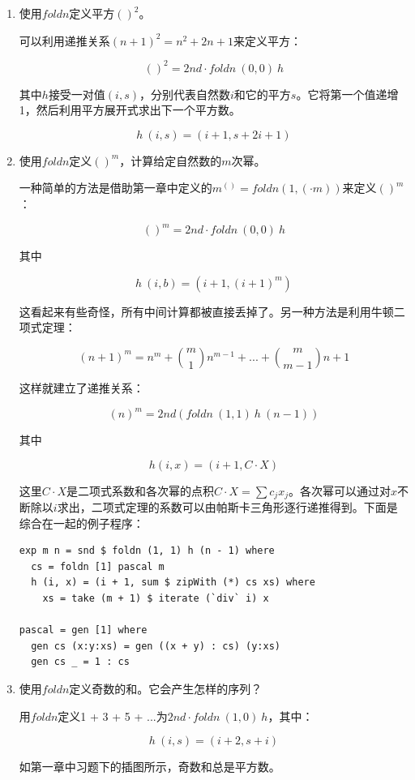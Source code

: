 \documentclass[UTF8]{article}
\begin{document}
\begin{enumerate}
\item 使用$foldn$定义平方$()^2$。

可以利用递推关系$(n+1)^2 = n^2 + 2n + 1$来定义平方：

\[
()^2 = 2nd \cdot foldn\ (0, 0)\ h
\]

其中$h$接受一对值$(i, s)$，分别代表自然数$i$和它的平方$s$。它将第一个值递增1，然后利用平方展开式求出下一个平方数。

\[
h\ (i, s) = (i + 1, s + 2i + 1)
\]

\item 使用$foldn$定义$()^m$，计算给定自然数的$m$次幂。

一种简单的方法是借助第一章中定义的$m^{()} = foldn(1, (\cdot m))$来定义$()^m$：

\[
()^m = 2nd \cdot foldn\ (0, 0)\ h
\]

其中

\[
h\ (i, b) = (i + 1, (i + 1)^m)
\]

这看起来有些奇怪，所有中间计算都被直接丢掉了。另一种方法是利用牛顿二项式定理：

\[
(n + 1)^m = n^m + \binom{m}{1} n^{m-1} + ... + \binom{m}{m-1} n + 1
\]

这样就建立了递推关系：

\[
(n)^m = 2nd(foldn\ (1, 1)\ h\ (n - 1))
\]

其中

\[
h (i, x) = (i + 1, C \cdot X)
\]

这里$C \cdot X$是二项式系数和各次幂的点积$C \cdot X = \sum c_j x_j$。各次幂可以通过对$x$不断除以$i$求出，二项式定理的系数可以由帕斯卡三角形逐行递推得到。下面是综合在一起的例子程序：

\lstset{language=Haskell
    , frame=single
}
\begin{lstlisting}
exp m n = snd $ foldn (1, 1) h (n - 1) where
  cs = foldn [1] pascal m
  h (i, x) = (i + 1, sum $ zipWith (*) cs xs) where
    xs = take (m + 1) $ iterate (`div` i) x

pascal = gen [1] where
  gen cs (x:y:xs) = gen ((x + y) : cs) (y:xs)
  gen cs _ = 1 : cs
\end{lstlisting}

\item 使用$foldn$定义奇数的和。它会产生怎样的序列？

用$foldn$定义1 + 3 + 5 + ...为$2nd \cdot foldn\ (1, 0)\ h$，其中：

\[
h\ (i, s) = (i + 2, s + i)
\]

如第一章中习题下的插图所示，奇数和总是平方数。


\end{enumerate}
\end{document}
